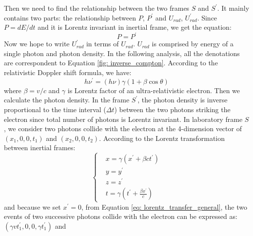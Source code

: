 \documentclass[12pt]{report}
\begin{document}
      Then we need to find the relationship between the two frames $S$ and $S^{\prime}$. 
      It mainly contains two parts: the relationship between $P$, $P^{\prime}$ and 
      $U_{rad}$, $U_{rad}^{\prime}$. Since $P = dE/dt$ and it is Lorentz invariant 
      in inertial frame, we get the equation: 
      \begin{equation}
        \label{eq: power_is_equal}
        P = P^{\prime}
      \end{equation}
      Now we hope to write $U_{rad}^{\prime}$ in terms of $U_{rad}$. $U_{rad}$ is 
      comprised by energy of a single photon and photon density. In the following
      analysis, all the denotations are correspondent to Equation \ref{fig: inverse_compton}. 
      According to the relativistic Doppler shift formula, we have: 
      \begin{equation}
        \label{eq: doppler_shift}
        h \nu^{\prime} = \left(h \nu\right) \gamma \left(1 + \beta \cos{\theta} \right)
      \end{equation}
      where $\beta = v / c$ and $\gamma$ is Lorentz factor of an ultra-relativistic 
      electron. Then we calculate the photon density. In the frame $S^{\prime}$, the 
      photon density is inverse proportional to the time interval ($\Delta t$) between 
      the two photons striking the electron since total number of photons is Lorentz 
      invariant. In laboratory frame $S$, we consider two photons collide with the 
      electron at the 4-dimension vector of 
      $\left(x_{1}, 0, 0, t_{1}\right)$ and $\left(x_{2}, 0, 0, t_{2}\right)$. 
      According to the Lorentz transformation between inertial frames: 
      \begin{equation}
        \label{eq: lorentz_transfer_general}
          \begin{cases}
            & x = \gamma \left( x^{\prime} + \beta c t^{\prime} \right)\\
            & y = y^{\prime} \\
            & z = z^{\prime} \\ 
            & t = \gamma \left(t^{\prime} + \frac{\beta x^{\prime}}{c}\right)
          \end{cases}       
      \end{equation}
      and because we set $x^{\prime} = 0$, from Equation \ref{eq: lorentz_transfer_general}, 
      the two events of two successive photons collide with the electron can be 
      expressed as:
      $\left(\gamma v t_{1}^{\prime}, 0, 0, \gamma t_{1}^{\prime}\right)$ and 
\end{document}
